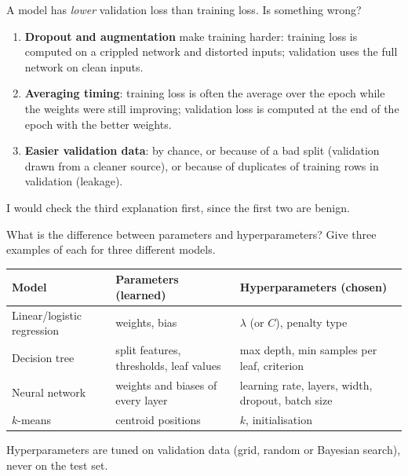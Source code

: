 \begin{qa}{\deep A model has \emph{lower} validation loss than training loss. Is something wrong?}
\why
\begin{enumerate}
\item \textbf{Dropout and augmentation} make training harder: training loss is computed on a crippled
  network and distorted inputs; validation uses the full network on clean inputs.
\item \textbf{Averaging timing}: training loss is often the average over the epoch while the weights were
  still improving; validation loss is computed at the end of the epoch with the better weights.
\item \textbf{Easier validation data}: by chance, or because of a bad split (validation drawn from a cleaner
  source), or because of duplicates of training rows in validation (leakage).
\end{enumerate}
I would check the third explanation first, since the first two are benign.
\end{qa}

\begin{qa}{What is the difference between parameters and hyperparameters? Give three examples of each for
three different models.}
\why
\begin{center}\small
\begin{tabularx}{\linewidth}{l X X}
\toprule
Model & Parameters (learned) & Hyperparameters (chosen)\\
\midrule
Linear/logistic regression & weights, bias & $\lambda$ (or $C$), penalty type\\
Decision tree & split features, thresholds, leaf values & max depth, min samples per leaf, criterion\\
Neural network & weights and biases of every layer & learning rate, layers, width, dropout, batch size\\
$k$-means & centroid positions & $k$, initialisation\\
\bottomrule
\end{tabularx}
\end{center}
Hyperparameters are tuned on validation data (grid, random or Bayesian search), never on the test set.
\end{qa}

